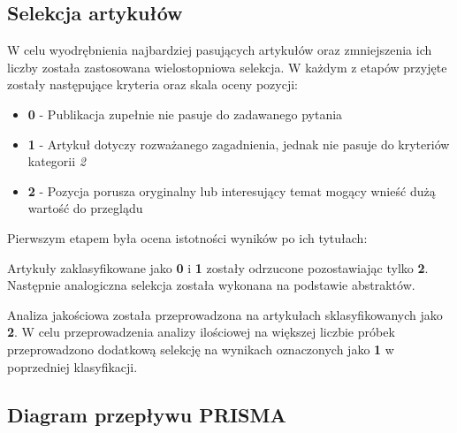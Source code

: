 \subsection{Selekcja artykułów}
W celu wyodrębnienia najbardziej pasujących artykułów oraz zmniejszenia ich liczby została zastosowana wielostopniowa selekcja. W każdym z etapów przyjęte zostały następujące kryteria oraz skala oceny pozycji:
\begin{itemize}
    \item {\bf 0} - Publikacja zupełnie nie pasuje do zadawanego pytania
    \item {\bf 1} - Artykuł dotyczy rozważanego zagadnienia, jednak nie pasuje do kryteriów kategorii {\it 2}
    \item {\bf 2} - Pozycja porusza oryginalny lub interesujący temat mogący wnieść dużą wartość do przeglądu
\end{itemize}
Pierwszym etapem była ocena istotności wyników po ich tytułach:

Artykuły zaklasyfikowane jako {\bf0} i {\bf1} zostały odrzucone pozostawiając tylko {\bf2}. Następnie analogiczna selekcja została wykonana na podstawie abstraktów.

Analiza jakościowa została przeprowadzona na artykułach sklasyfikowanych jako \textbf{2}. W celu przeprowadzenia analizy ilościowej na większej liczbie próbek przeprowadzono dodatkową selekcję na wynikach oznaczonych jako \textbf{1} w poprzedniej klasyfikacji.


\subsection{Diagram przepływu PRISMA}
\begin{figure}[H]
	\centering
	
	\label{fig:prisma_diagram}
\end{figure}
